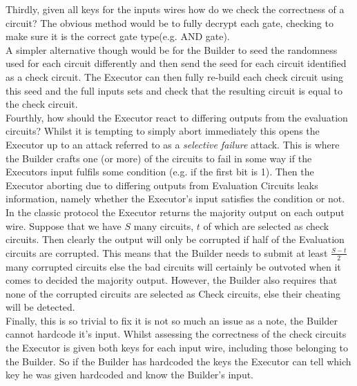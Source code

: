 \documentclass[ %
                    author={Nicholas Tutte},
                supervisor={Prof. Nigel Smart},
                    degree={MEng},
                     title={Secure Two Party Computation},
                  subtitle={A practical comparison of recent protocols},
                      type={Research - GG1K},
                      year={2015} ]{dissertation}
\begin{document}

				Thirdly, given all keys for the inputs wires how do we check the correctness of a circuit? The obvious method would be to fully decrypt each gate, checking to make sure it is the correct gate type(e.g. AND gate).\\

				A simpler alternative though would be for the Builder to seed the randomness used for each circuit differently and then send the seed for each circuit identified as a check circuit. The Executor can then fully re-build each check circuit using this seed and the full inputs sets and check that the resulting circuit is equal to the check circuit.\\

				Fourthly, how should the Executor react to differing outputs from the evaluation circuits? Whilst it is tempting to simply abort immediately this opens the Executor up to an attack referred to as a \emph{selective failure} attack. This is where the Builder crafts one (or more) of the circuits to fail in some way if the Executors input fulfils some condition (e.g. if the first bit is 1). Then the Executor aborting due to differing outputs from Evaluation Circuits leaks information, namely whether the Executor's input satisfies the condition or not.\\

				In the classic protocol the Executor returns the majority output on each output wire. Suppose that we have $S$ many circuits, $t$ of which are selected as check circuits. Then clearly the output will only be corrupted if half of the Evaluation circuits are corrupted. This means that the Builder needs to submit at least $\frac{S - t}{2}$ many corrupted circuits else the bad circuits will certainly be outvoted when it comes to decided the majority output. However, the Builder also requires that none of the corrupted circuits are selected as Check circuits, else their cheating will be detected.\\

				Finally, this is so trivial to fix it is not so much an issue as a note, the Builder cannot hardcode it's input. Whilst assessing the correctness of the check circuits the Executor is given both keys for each input wire, including those belonging to the Builder. So if the Builder has hardcoded the keys the Executor can tell which key he was given hardcoded and know the Builder's input.
\end{document}

